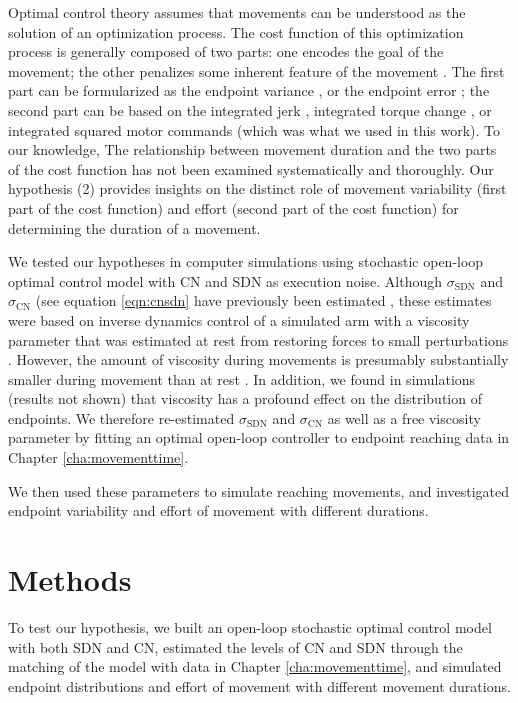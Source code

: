 Optimal control theory assumes that movements can be understood as the solution of an optimization process.
The cost function of this optimization process is generally composed of two parts: one encodes the goal of the movement; the other penalizes some inherent feature of the movement \cite{Diedrichsen2010}. 
The first part can be formularized as the endpoint variance \cite{Harris1998}, or the endpoint error \cite{Todorov2005}; 
the second part can be based on the integrated jerk \cite{Flash1985}, integrated torque change \cite{Uno1989}, or integrated squared motor commands \cite{Todorov2002} (which was what we used in this work). 
To our knowledge, The relationship between movement duration and the two parts of the cost function has not been examined systematically and thoroughly.
Our hypothesis (2) provides insights on the distinct role of movement variability (first part of the cost function) and effort (second part of the cost function) for determining the duration of a movement.

We tested our hypotheses in computer simulations using stochastic open-loop optimal control \cite{Todorov2005} model with CN and SDN as execution noise.  
Although $\sigma_{\text{SDN}}$ and $\sigma_{\text{CN}}$ (see equation \ref{eqn:cnsdn} have previously been estimated \cite{VanBeers2004}, these estimates were based on inverse dynamics control of a simulated arm with a viscosity parameter that was estimated at rest from restoring forces to small perturbations \cite{Gomi1998}. 
However, the amount of viscosity during movements is presumably substantially smaller during movement than at rest \cite{Burdet2013}. 
In addition, we found in simulations (results not shown) that viscosity has a profound effect on the distribution of endpoints.  
We therefore re-estimated $\sigma_{\text{SDN}}$ and $\sigma_{\text{CN}}$ as well as a free viscosity parameter by fitting an optimal open-loop controller to endpoint reaching data in Chapter \ref{cha:movementtime}.

We then used these parameters to simulate reaching movements, and investigated endpoint variability and effort of movement with different durations.

\section{Methods}
To test our hypothesis, we built an open-loop stochastic optimal control model with both SDN and CN, estimated the levels of CN and SDN through the matching of the model with data in Chapter \ref{cha:movementtime}, and simulated endpoint distributions and effort of movement with different movement durations.


